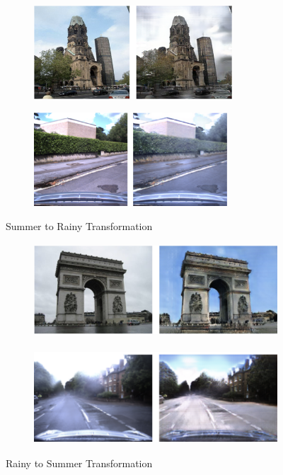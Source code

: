 \documentclass{article}
\begin{document}
\begin{figure}[H]
	\begin{subfigure}{0.5\textwidth}
		\centering
		\includegraphics[width=0.9\linewidth, height=35mm]{images/s2m_1}
	\end{subfigure}
	\begin{subfigure}{.5\textwidth}
		\centering
		\includegraphics[width=.9\linewidth,height=35mm]{images/s2m_2.png}
	\end{subfigure}
	\caption{Summer to Rainy Transformation}
	\begin{subfigure}{0.5\textwidth}
		\centering
		\includegraphics[width=0.9\linewidth, height=35mm]{images/m2s_1.png}
	\end{subfigure}
	\begin{subfigure}{.5\textwidth}
		\centering
		\includegraphics[width=.9\linewidth,height=35mm]{images/m2s_2.png}
	\end{subfigure}
	\caption{Rainy to Summer Transformation}
	\label{fig:v1_failure}
\end{figure}
\end{document}
